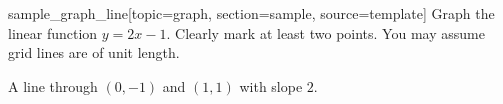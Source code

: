 \begin{problem}{sample_graph_line}[topic=graph, section=sample, source=template]
	Graph the linear function $y = 2x - 1$. Clearly mark at least two
	points. You may assume grid lines are of unit length.
	\begin{center}
	\end{center}
	\solution
	A line through $(0, -1)$ and $(1, 1)$ with slope $2$.
\end{problem}
